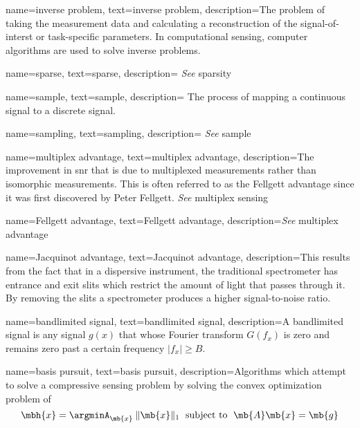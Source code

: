 {
name={inverse problem},
text={inverse problem},
description={The problem of taking the measurement data and calculating a reconstruction of the signal-of-interst or task-specific parameters. In computational sensing, computer algorithms are used to solve inverse problems.}
}

{
name={sparse},
text={sparse},
description={ \emph{See} \gls{sparsity}}
}

{
name={sample},
text={sample},
description={ The process of mapping a continuous signal to a discrete signal.  }
}

{
name={sampling},
text={sampling},
description={ \emph{See} \gls{sample}  }
}



{
name={multiplex advantage},
text={multiplex advantage},
description={The improvement in \gls{snr} that is due to multiplexed measurements rather than isomorphic measurements. This is often referred to as the Fellgett advantage since it was first discovered by Peter Fellgett. \emph{See} \gls{multiplex sensing}} 
}

{
name={Fellgett advantage},
text={Fellgett advantage},
description={\emph{See} \gls{multiplex advantage}} 
}

{
name={Jacquinot advantage},
text={Jacquinot advantage},
description={This results from the fact that in a dispersive instrument, the traditional spectrometer has entrance and exit slits which restrict the amount of light that passes through it. By removing the slits a spectrometer produces a higher signal-to-noise ratio.} 
}

{
name={bandlimited signal},
text={bandlimited signal},
description={A bandlimited signal is any signal $ g(x) $ that whose Fourier transform $ G(f_x) $ is zero and remains zero past a certain frequency $ \lvert f_x \rvert \geq B$.} 
}

{
name={basis pursuit},
text={basis pursuit},
description={Algorithms which attempt to solve a compressive sensing problem by solving the convex optimization problem of 
\begin{equation}
	\mbh{x} = \argminA_{\mb{x}} \: \| \mb{x} \|_{1} \text{\; subject to \;} \mb{A}\mb{x} = \mb{g}
\end{equation} 
}
}

